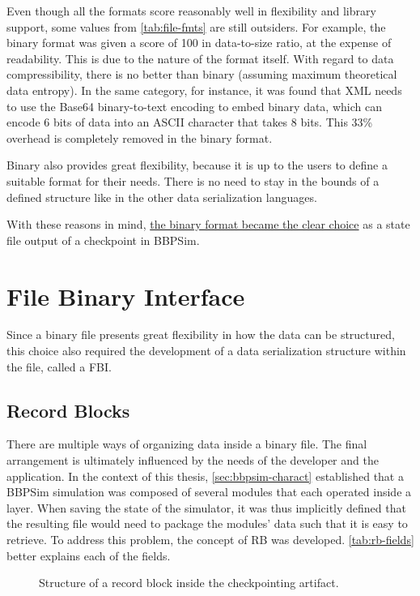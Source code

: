 {Even though all the formats score reasonably well in flexibility and library support, some values from \autoref{tab:file-fmts} are still outsiders. For example, the binary format was given a score of 100 in data-to-size ratio, at the expense of readability. This is due to the nature of the format itself. With regard to data compressibility, there is no better than binary (assuming maximum theoretical data entropy\cite{art:shannon}). In the same category, for instance, it was found that XML needs to use the Base64 binary-to-text encoding to embed binary data, which can encode 6 bits of data into an \gls{ASCII} character that takes 8 bits\cite{art:base64}. This 33\% overhead is completely removed in the binary format. 

Binary also provides great flexibility, because it is up to the users to define a suitable format for their needs. There is no need to stay in the bounds of a defined structure like in the other data serialization languages.

With these reasons in mind, \ul{the binary format became the clear choice} as a state file output of a checkpoint in BBPSim.

\section{File Binary Interface}
Since a binary file presents great flexibility in how the data can be structured, this choice also required the development of a data serialization structure within the file, called a \gls{FBI}.

\subsection*{Record Blocks}
There are multiple ways of organizing data inside a binary file. The final arrangement is ultimately influenced by the needs of the developer and the application. In the context of this thesis, \autoref{sec:bbpsim-charact} established that a BBPSim simulation was composed of several modules that each operated inside a layer. When saving the state of the simulator, it was thus implicitly defined that the resulting file would need to package the modules' data such that it is easy to retrieve. To address this problem, the concept of \gls{RB} was developed. \autoref{tab:rb-fields} better explains each of the fields.

\begin{figure}[h]
	\vspace{6pt}
	\small
	\centering
	
	\caption{Structure of a record block inside the checkpointing artifact.}
	\label{fig:rb}
\end{figure}

}
